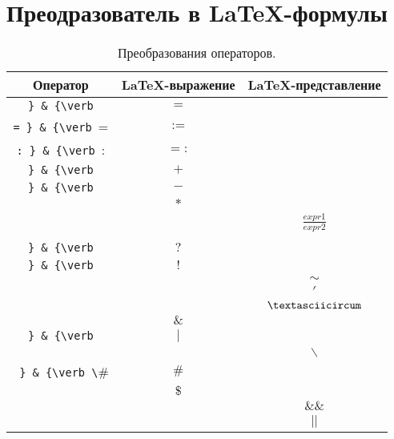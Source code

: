 \documentclass[12pt]{amsart}
\begin{document}
\section*{Преодразователь в \LaTeX-формулы}

\renewcommand{\arraystretch}{1.3}
\begin{longtable}{|c|c|c|}
  \caption[Преобразования операторов.]{Преобразования операторов.}
  \\
    \hline

    Оператор & \LaTeX-выражение & \LaTeX-представление\\
    \endfirsthead
    
    \hline
    {\verb = } & {\verb = } & ${=}$
    \\
    \hline
    {\verb := } & {\verb := } & ${:=}$
    \\
    \hline
    {\verb =: } & {\verb =: } & ${=:}$
    \\
    \hline
    {\verb + } & {\verb + } & ${+}$
    \\
    \hline
    {\verb - } & {\verb - } & ${-}$
    \\
    \hline
    {\verb * } & {\verb \ast } & ${\ast}$
    \\
    \hline
    {\verb / } & {\verb \frac{}{} } & ${\frac{expr1}{expr2}}$
    \\
    \hline
    {\verb % } & {\verb \% } & ${\%}$
    \\
    \hline
    {\verb ? } & {\verb ? } & ${?}$
    \\
    \hline
    {\verb ! } & {\verb ! } & ${!}$
    \\
    \hline
    {\verb ~ } & {\verb \sim } & ${\sim}$
    \\
    \hline
    {\verb ' } & {\verb \prime } & ${\prime}$
    \\
    \hline
    {\verb ^ } & {\verb \textasciicircum } & ${\textasciicircum}$
    \\
    \hline
    {\verb & } & {\verb \& } & ${\&}$
    \\
    \hline
    {\verb | } & {\verb | } & ${|}$
    \\
    \hline
    {\verb \ } & {\verb \backslash } & ${\backslash}$
    \\
    \hline
    {\verb # } & {\verb \# } & ${\#}$
    \\
    \hline
    {\verb $ } & {\verb \$ } & ${\$}$ 
    \\
    \hline
    {\verb && } & {\verb \&\& } & ${\&\&}$
    \\
    \hline
    {\verb || } & {\verb || } & ${||}$
}
\end{longtable}
\end{document}
